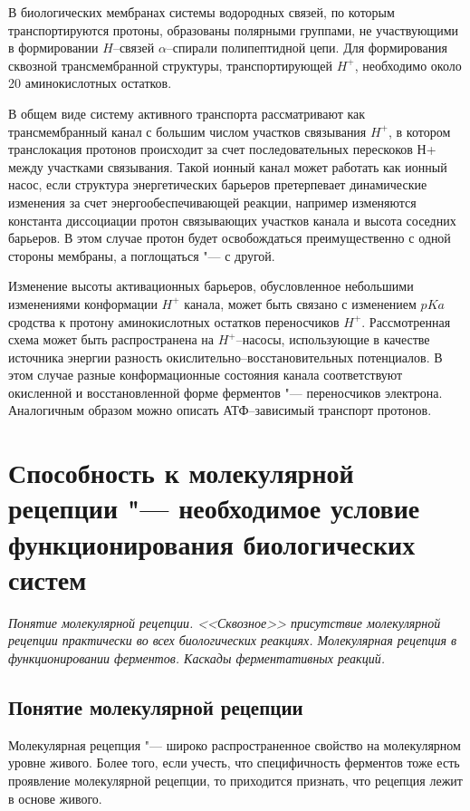 \documentclass[12pt,a4paper,oneside]{book}
\begin{document}
В биологических мембранах системы водородных связей, по которым транспортируются протоны, образованы полярными группами, не участвующими в формировании $H$--связей $\alpha$--спирали полипептидной цепи. Для формирования сквозной трансмембранной структуры, транспортирующей $H^+$, необходимо около 20 аминокислотных остатков.

В общем виде систему активного транспорта рассматривают как трансмембранный канал с большим числом участков связывания $H^+$, в котором транслокация протонов происходит за счет последовательных перескоков Н+ между участками связывания. Такой ионный канал может работать как ионный насос, если структура энергетических барьеров претерпевает динамические изменения за счет энергообеспечивающей реакции, например изменяются константа диссоциации протон связывающих участков канала и высота соседних барьеров. В этом случае протон будет освобождаться преимущественно с одной стороны мембраны, а поглощаться "--- с другой. 

Изменение высоты активационных барьеров, обусловленное небольшими изменениями конформации $H^+$ канала, может быть связано с изменением $pKa$ сродства к протону аминокислотных остатков переносчиков $H^+$. Рассмотренная схема может быть распространена на $H^+$--насосы, использующие в качестве источника энергии разность окислительно--восстановительных потенциалов. В этом случае разные конформационные состояния канала соответствуют окисленной и восстановленной форме ферментов "--- переносчиков электрона. Аналогичным образом можно описать АТФ--зависимый транспорт протонов.



\newpage
\section{Способность к молекулярной рецепции "--- необходимое условие функционирования биологических систем}
{\it Понятие молекулярной рецепции. <<Сквозное>> присутствие молекулярной рецепции практически во всех биологических реакциях. Молекулярная рецепция в функционировании ферментов. Каскады ферментативных реакций. }

\subsection{Понятие молекулярной рецепции}

Молекулярная рецепция "--- широко распространенное свойство на молекулярном уровне живого. Более того, если учесть, что специфичность ферментов тоже есть проявление молекулярной рецепции, то приходится признать, что рецепция лежит в основе живого.
\end{document}
